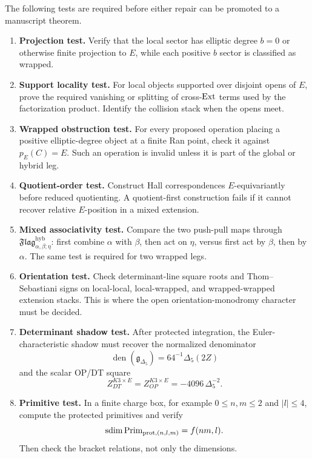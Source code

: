 The following tests are required before either repair can be promoted to
a manuscript theorem.

\begin{enumerate}
\item \textbf{Projection test.}  Verify that the local sector has
elliptic degree \(b=0\) or otherwise finite projection to \(E\), while
each positive \(b\) sector is classified as wrapped.
\item \textbf{Support locality test.}  For local objects supported over
disjoint opens of \(E\), prove the required vanishing or splitting of
cross-\(\operatorname{Ext}\) terms used by the factorization product.  Identify the
collision stack when the opens meet.
\item \textbf{Wrapped obstruction test.}  For every proposed operation
placing a positive elliptic-degree object at a finite Ran point, check it
against \(p_E(C)=E\).  Such an operation is invalid unless it is part of
the global or hybrid leg.
\item \textbf{Quotient-order test.}  Construct Hall correspondences
\(E\)-equivariantly before reduced quotienting.  A quotient-first
construction fails if it cannot recover relative \(E\)-position in a
mixed extension.
\item \textbf{Mixed associativity test.}  Compare the two push-pull
maps through
\(\mathfrak{Flag}^{\mathrm{hyb}}_{\alpha,\beta;\eta}\):
first combine \(\alpha\) with \(\beta\), then act on \(\eta\), versus
first act by \(\beta\), then by \(\alpha\).  The same test is required
for two wrapped legs.
\item \textbf{Orientation test.}  Check determinant-line square roots
and Thom--Sebastiani signs on local-local, local-wrapped, and
wrapped-wrapped extension stacks.  This is where the open
orientation-monodromy character must be decided.
\item \textbf{Determinant shadow test.}  After protected integration,
the Euler-characteristic shadow must recover the normalized denominator
\[
\operatorname{den}(\mathfrak g_{\Delta_5})=64^{-1}\Delta_5(2Z)
\]
and the scalar OP/DT square
\[
Z^{K3\times E}_{DT}=Z^{K3\times E}_{OP}=-4096\,\Delta_5^{-2}.
\]
\item \textbf{Primitive test.}  In a finite charge box, for example
\(0\le n,m\le 2\) and \(|l|\le 4\), compute the protected primitives and
verify
\[
\operatorname{sdim} \operatorname{Prim}_{\mathrm{prot},(n,l,m)}=f(nm,l).
\]
Then check the bracket relations, not only the dimensions.
\end{enumerate}

